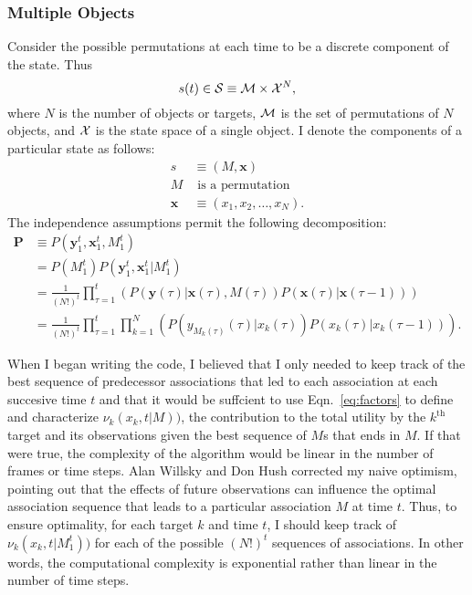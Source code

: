 \documentclass[11pt]{article}
\newcommand{\ti}[2]{{#1}{(#2)}}                         %
\newcommand{\ts}[4]{{#1}_{#3}^{#4}} %
\begin{document}
\subsubsection{Multiple Objects}
\label{sec:multiple}

Consider the possible permutations at each time to be a discrete
component of the state.  Thus
\begin{equation*}
  \ti{s}{t} \in {\cal S} \equiv {\cal M} \times {\cal X}^{N},
\end{equation*}
where $N$ is the number of objects or targets, $\cal M$ is the set of
permutations of $N$ objects, and ${\cal X}$ is the state space of a
single object.  I denote the components of a particular state as
follows:
\newcommand{\bx}{{\mathbf{x}}}
\newcommand{\by}{{\mathbf{y}}}
\begin{align*}
  s &\equiv (M,\bx) \\
  M & \text{ is a permutation} \\
  \bx &\equiv (x_1,x_2,\ldots,x_N).
\end{align*}
The independence assumptions permit the following decomposition:
\begin{align}
  \mathbf{P} &\equiv
  P(\ts{\by}{\tau}{1}{t},\ts{\bx}{\tau}{1}{t},\ts{M}{\tau}{1}{t})
  \nonumber \\
  &= P(\ts{M}{\tau}{1}{t})
  P(\ts{\by}{\tau}{1}{t},\ts{\bx}{\tau}{1}{t}|\ts{M}{\tau}{1}{t})
  \nonumber \\
  &= \frac{1}{(N!)^t} \prod_{\tau=1}^t \left(
    P(\ti{\by}{\tau}|\ti{\bx}{\tau},\ti{M}{\tau})
    P(\ti{\bx}{\tau}|\ti{\bx}{\tau-1}) \right) \nonumber \\
  \label{eq:factors}
  &= \frac{1}{(N!)^t} \prod_{\tau=1}^t  \prod_{k=1}^N \left(
  P(\ti{y_{M_k(\tau)}}{\tau}|\ti{x_k}{\tau})
  P(\ti{x_k}{\tau}|\ti{x_k}{\tau-1}) \right).
\end{align}
\newcommand{\mmm}{\max_{\ts{M}{\tau}{1}{t}:\ti{M}{t}=M}}
\newcommand{\mxx}{\max_{\ts{\bx}{\tau}{1}{t}:\ti{\bx}{t}=\bx}}

When I began writing the code, I believed that I only needed to keep
track of the best sequence of predecessor associations that led to
each association at each succesive time $t$ and that it would be
suffcient to use Eqn.~\eqref{eq:factors} to define and characterize
$\nu_k(x_k,t|M))$, the contribution to the total utility by the
$k^{\text{th}}$ target and its observations given the best sequence of
$M$s that ends in $M$.  If that were true, the complexity of the
algorithm would be linear in the number of frames or time steps.  Alan
Willsky and Don Hush corrected my naive optimism, pointing out that
the effects of future observations can influence the optimal
association sequence that leads to a particular association $M$ at
time $t$.  Thus, to ensure optimality, for each target $k$ and time
$t$, I should keep track of $\nu_k(x_k,t|\ts{M}{}{1}{t}))$ for each of
the possible $(N!)^t$ sequences of associations.  In other words, the
computational complexity is exponential rather than linear in the
number of time steps.
\end{document}
